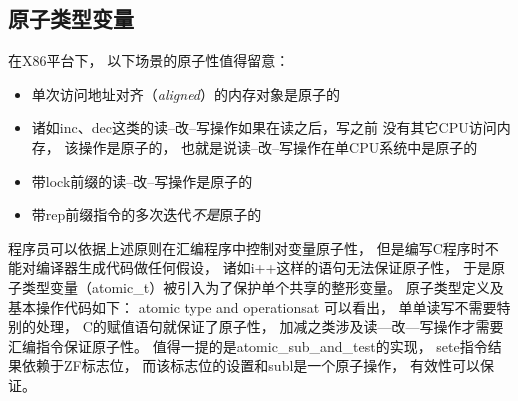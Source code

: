 \documentclass[11pt]{article}
\begin{document}
\subsection{原子类型变量}
在X86平台下，
以下场景的原子性值得留意：
\begin{itemize}
  \item 单次访问地址对齐（{\it aligned}）的内存对象是原子的
  \item 诸如inc、dec这类的读--改--写操作如果在读之后，写之前%
    没有其它CPU访问内存，
    该操作是原子的，
    也就是说读--改--写操作在单CPU系统中是原子的
  \item 带lock前缀的读--改--写操作是原子的
  \item 带rep前缀指令的多次迭代{\em 不是}原子的
\end{itemize}
程序员可以依据上述原则在汇编程序中控制对变量原子性，
但是编写C程序时不能对编译器生成代码做任何假设，
诸如i++这样的语句无法保证原子性，
于是原子类型变量（atomic\_t）被引入为了保护单个共享的整形变量。
原子类型定义及基本操作代码如下：
              {atomic type and operations}{at}
可以看出，
单单读写不需要特别的处理，
C的赋值语句就保证了原子性，
加减之类涉及读—改—写操作才需要汇编指令保证原子性。
值得一提的是atomic\_sub\_and\_test的实现，
sete指令结果依赖于ZF标志位，
而该标志位的设置和subl是一个原子操作，
有效性可以保证。
\end{document}

